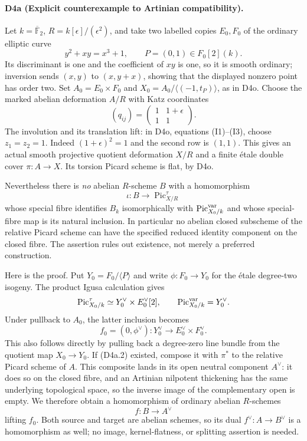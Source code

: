 \paragraph{D4a (Explicit counterexample to Artinian compatibility).}
Let $k=\overline{\mathbb F}_2$, $R=k[\epsilon]/(\epsilon^2)$,
and take two labelled copies $E_0,F_0$ of the ordinary elliptic
curve
\[
 y^2+xy=x^3+1,
 \qquad P=(0,1)\in F_0[2](k).
\]
Its discriminant is one and the coefficient of $xy$ is one, so it
is smooth ordinary; inversion sends $(x,y)$ to $(x,y+x)$,
showing that the displayed nonzero point has order two.
Set $A_0=E_0\times F_0$ and
$X_0=A_0/\langle(-1,t_P)\rangle$, as in D4o.
Choose the marked abelian deformation $A/R$ with Katz coordinates
\[
 (q_{ij})=\begin{pmatrix}1&1+\epsilon\\1&1\end{pmatrix}.
                                                        \tag{D4a.1}
\]
The involution and its translation lift: in D4o, equations
(I1)--(I3), choose $z_1=z_2=1$. Indeed
$(1+\epsilon)^2=1$ and the second row is $(1,1)$.
This gives an actual smooth projective quotient deformation
$X/R$ and a finite étale double cover $\pi:A\to X$.
Its torsion Picard scheme is flat, by D4o.

Nevertheless there is \emph{no} abelian $R$-scheme $B$ with a
homomorphism
\[
 \iota:B\longrightarrow\operatorname{Pic}^{\tau}_{X/R}
                                                        \tag{D4a.2}
\]
whose special fibre identifies $B_k$ isomorphically with
$\operatorname{Pic}^{\rm var}_{X_0/k}$ and whose special-fibre
map is its natural inclusion. In particular no abelian closed
subscheme of the relative Picard scheme can have the specified
reduced identity component on the closed fibre. The assertion
rules out existence, not merely a preferred construction.

Here is the proof. Put $Y_0=F_0/\langle P\rangle$ and write
$\phi:F_0\to Y_0$ for the étale degree-two isogeny. The product
Igusa calculation gives
\[
 \operatorname{Pic}^{\tau}_{X_0/k}
     \simeq Y_0^\vee\times E_0^\vee[2],
 \qquad \operatorname{Pic}^{\rm var}_{X_0/k}=Y_0^\vee.
\]
Under pullback to $A_0$, the latter inclusion becomes
\[
 f_0=(0,\phi^\vee):Y_0^\vee
                         \longrightarrow E_0^\vee\times F_0^\vee.
                                                        \tag{D4a.3}
\]
This also follows directly by pulling back a degree-zero line
bundle from the quotient map $X_0\to Y_0$.
If (D4a.2) existed, compose it with $\pi^*$ to the relative
Picard scheme of $A$. This composite lands in its open neutral
component $A^\vee$: it does so on the closed fibre, and an
Artinian nilpotent thickening has the same underlying topological
space, so the inverse image of the complementary open is empty.
We therefore obtain a homomorphism of ordinary abelian $R$-schemes
\[
 f:B\longrightarrow A^\vee
\]
lifting $f_0$. Both source and target are abelian schemes, so its
dual $f^\vee:A\to B^\vee$ is a homomorphism as well; no image,
kernel-flatness, or splitting assertion is needed.

